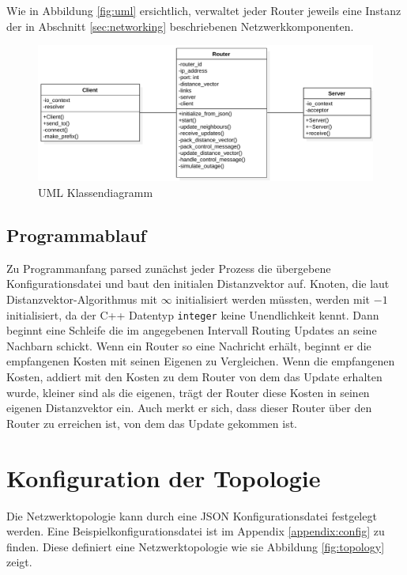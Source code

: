 \documentclass[a4paper,ngerman]{article}
\begin{document}
Wie in Abbildung \vref{fig:uml} ersichtlich, verwaltet jeder Router jeweils eine Instanz der in Abschnitt \vref{sec:networking} beschriebenen Netzwerkkomponenten.

\begin{figure}[H]
    \centering
    \includegraphics[width=\textwidth,keepaspectratio]{uml}
    \caption{UML Klassendiagramm}
    \label{fig:uml}
\end{figure}

\subsection{Programmablauf}

Zu Programmanfang parsed zunächst jeder Prozess die übergebene Konfigurationsdatei und baut den initialen Distanzvektor auf. Knoten, die laut Distanzvektor-Algorithmus mit $ \infty $ initialisiert werden müssten, werden mit $ -1 $ initialisiert, da der C++ Datentyp \lstinline{integer} keine Unendlichkeit kennt.  Dann beginnt eine Schleife die im angegebenen Intervall Routing Updates an seine Nachbarn schickt. Wenn ein Router so eine Nachricht erhält, beginnt er die empfangenen Kosten mit seinen Eigenen zu Vergleichen. Wenn die empfangenen Kosten, addiert mit den Kosten zu dem Router von dem das Update erhalten wurde, kleiner sind als die eigenen, trägt der Router diese Kosten in seinen eigenen Distanzvektor ein. Auch merkt er sich, dass dieser Router über den Router zu erreichen ist, von dem das Update gekommen ist.

\section{Konfiguration der Topologie}
\label{sec:configuration}

Die Netzwerktopologie kann durch eine JSON Konfigurationsdatei festgelegt werden. Eine Beispielkonfigurationsdatei ist im Appendix \vref{appendix:config} zu finden. Diese definiert eine Netzwerktopologie wie sie Abbildung \vref{fig:topology} zeigt.
\end{document}
